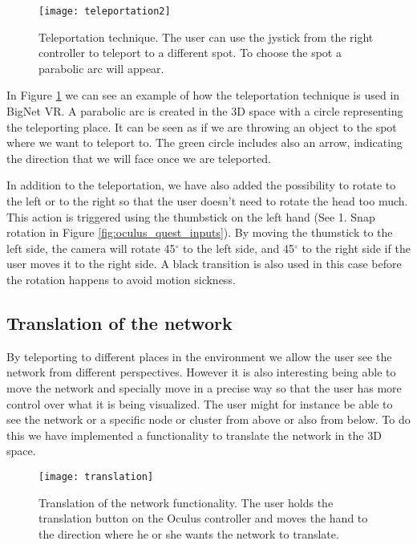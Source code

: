 \begin{figure}[h!]
    \centering%
    \texttt{[image: teleportation2]}
    \caption{Teleportation technique. The user can use the jystick from the right controller to teleport to a different spot. To choose the spot a parabolic arc will appear.}
    \label{fig:teleportation}
\end{figure}%

In Figure \ref{fig:teleportation} we can see an example of how the teleportation technique is used in BigNet VR. A  parabolic arc is created in the 3D space with a circle representing the teleporting place. It can be seen as if we are throwing an object to the spot where we want to teleport to. The green circle includes also an arrow, indicating the direction that we will face once we are teleported.

In addition to the teleportation, we have also added the possibility to rotate to the left or to the right so that the user doesn't need to rotate the head too much. This action is triggered using the thumbstick on the left hand (See 1. Snap rotation in Figure \ref{fig:oculus_quest_inputs}). By moving the thumstick to the left side, the camera will rotate 45$^{\circ}$ to the left side, and 45$^{\circ}$ to the right side if the user moves it to the right side. A black transition is also used in this case before the rotation happens to avoid motion sickness.

\subsection{Translation of the network}
By teleporting to different places in the environment we allow the user see the network from different perspectives. However it is also interesting being able to move the network and specially move in a precise way so that the user has more control over what it is being visualized. The user might for instance be able to see the network or a specific node or cluster from above or also from below. To do this we have implemented a functionality to translate the network in the 3D space.

\begin{figure}[h!]
    \centering%
    \texttt{[image: translation]}
    \caption{Translation of the network functionality. The user holds the translation button on the Oculus controller and moves the hand to the direction where he or she wants the network to translate.}
    \label{fig:translation}
\end{figure}%

